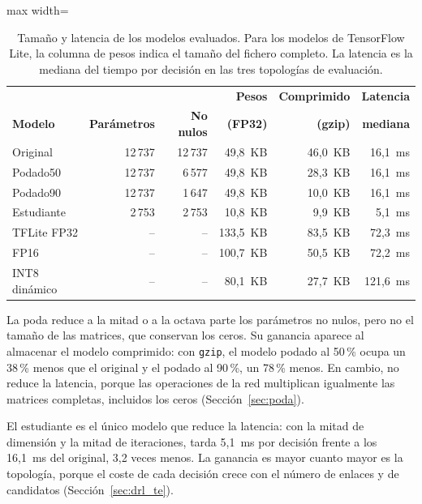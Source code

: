 \begin{table}[H]
	\centering
	\footnotesize
	\begin{adjustbox}{max width=\textwidth}
	\begin{tabular}{lrrrrr}
		\toprule
		& & & \textbf{Pesos} & \textbf{Comprimido} & \textbf{Latencia} \\
		\textbf{Modelo} & \textbf{Parámetros} & \textbf{No nulos} & \textbf{(FP32)} & \textbf{(gzip)} & \textbf{mediana} \\
		\midrule
		Original & 12\,737 & 12\,737 & 49,8~KB & 46,0~KB & 16,1~ms \\
		Podado50 & 12\,737 & 6\,577 & 49,8~KB & 28,3~KB & 16,1~ms \\
		Podado90 & 12\,737 & 1\,647 & 49,8~KB & 10,0~KB & 16,1~ms \\
		Estudiante & 2\,753 & 2\,753 & 10,8~KB & 9,9~KB & 5,1~ms \\
		\midrule
		TFLite FP32 & -- & -- & 133,5~KB & 83,5~KB & 72,3~ms \\
		FP16 & -- & -- & 100,7~KB & 50,5~KB & 72,2~ms \\
		INT8 dinámico & -- & -- & 80,1~KB & 27,7~KB & 121,6~ms \\
		\bottomrule
	\end{tabular}
	\end{adjustbox}
	\caption[Tamaño y latencia de los modelos evaluados]{Tamaño y latencia de los modelos evaluados. Para los modelos de TensorFlow Lite, la columna de pesos indica el tamaño del fichero completo. La latencia es la mediana del tiempo por decisión en las tres topologías de evaluación.}
	\label{tab:res_coste}
\end{table}

La poda reduce a la mitad o a la octava parte los parámetros no nulos, pero no el tamaño de las matrices, que conservan los ceros. Su ganancia aparece al almacenar el modelo comprimido: con \texttt{gzip}, el modelo podado al 50\,\% ocupa un 38\,\% menos que el original y el podado al 90\,\%, un 78\,\% menos. En cambio, no reduce la latencia, porque las operaciones de la red multiplican igualmente las matrices completas, incluidos los ceros (Sección~\ref{sec:poda}).

El estudiante es el único modelo que reduce la latencia: con la mitad de dimensión y la mitad de iteraciones, tarda 5,1~ms por decisión frente a los 16,1~ms del original, 3,2 veces menos. La ganancia es mayor cuanto mayor es la topología, porque el coste de cada decisión crece con el número de enlaces y de candidatos (Sección~\ref{sec:drl_te}).

